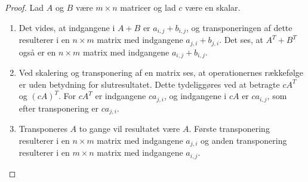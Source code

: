 %
\begin{proof}
Lad $A$ og $B$ være $m \times n$ matricer og lad $c$ være en skalar.
\begin{enumerate}[label=(\alph*)]
\item Det vides, at indgangene i $A+B$ er $a_{i,j} + b_{i,j}$, og transponeringen af dette resulterer i en $n \times m$ matrix med indgangene $a_{j,i} + b_{j,i}$.
Det ses, at  $A^T + B^T$ også er en $n \times m$ matrix med indgangene $a_{i,j} + b_{i,j}$.
%
\item Ved skalering og transponering af en matrix ses, at operationernes rækkefølge er uden betydning for slutresultatet.
Dette tydeliggøres ved at betragte $cA^T$ og $(cA)^T$.
For $cA^T$ er indgangene $ca_{j,i}$, og indgangene i $cA$ er $ca_{i,j}$, som efter transponering er $ca_{j,i}$.
% 
\item Transponeres $A$ to gange vil resultatet være $A$.
Første transponering resulterer i en $n \times m$ matrix med indgangene $a_{j,i}$ og anden transponering resulterer i en $m \times n$ matrix med indgangene $a_{i,j}$.
\end{enumerate}
\end{proof}